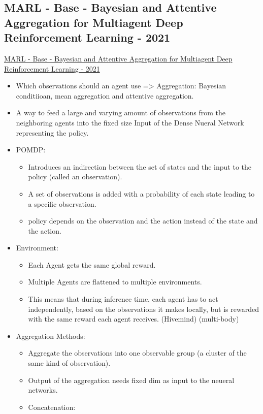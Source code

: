 \subsection{MARL - Base - Bayesian and Attentive Aggregation for Multiagent Deep Reinforcement Learning - 2021}
\href{https://phiresky.github.io/masters-thesis/}{MARL - Base - Bayesian and Attentive Aggregation for Multiagent Deep Reinforcement Learning - 2021}
\begin{itemize}[noitemsep,nolistsep]
	\item Which observations should an agent use => Aggregation: Bayesian conditiioan, mean aggregation and attentive aggregation.
	\item A way to feed a large and varying amount of observations from the neighboring agents into the fixed size Input of the Dense Nueral Network representing the policy.
	\item POMDP: 
	\begin{itemize}[noitemsep,nolistsep]
		\item Introduces an indirection between the set of states and the input to the policy (called an observation).
		\item A set of observations is added with a probability of each state leading to a specific observation.
		\item policy depends on the observation and the action  instead of the state and the action. 
	\end{itemize}
	\item Environment:
	\begin{itemize}[noitemsep,nolistsep]
		\item Each Agent gets the same global reward.
		\item Multiple Agents are flattened to multiple environments.
		\item This means that during inference time, each agent has to act independently, based on the observations it makes locally, but is rewarded with the same reward each agent receives. (Hivemind) (multi-body)
	\end{itemize}
	\item Aggregation Methods:
	\begin{itemize}[noitemsep,nolistsep]
		\item Aggregate the observations into one observable group (a cluster of the same kind of observation).
		\item Output of the aggregation needs fixed dim as input to the neueral networks.
		\item Concatenation: 

\end{itemize}
\end{itemize}
